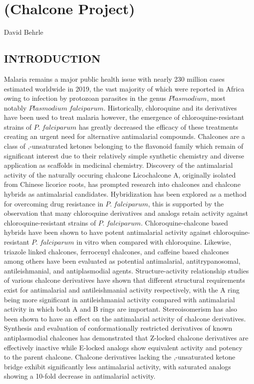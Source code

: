 \documentclass[12pt]{article}
\begin{document}
\linespread{1.25}
\raggedright
\setlength{\parskip}{6pt}

\section*{(Chalcone Project)}

David Behrle

\subsection*{INTRODUCTION}
Malaria remains a major public health issue with nearly 230 million cases estimated worldwide in 2019, the vast majority of which were reported in Africa owing to infection by protozoan parasites in the genus $Plasmodium$, most notably $Plasmodium\; falciparum$.\cite{Fikadu2023} Historically, chloroquine and its derivatives have been used to treat malaria however, the emergence of chloroquine-resistant strains of $P.\; falciparum$ has greatly decreased the efficacy of these treatments creating an urgent need for alternative antimalarial compounds.\cite{Fikadu2023,Yadav2012} Chalcones are a class of \textalpha,\textbeta-unsaturated ketones belonging to the flavonoid family which remain of significant interest due to their relatively simple synthetic chemistry and diverse application as scaffolds in medicinal chemistry.\cite{Qin2020} Discovery of the antimalarial activity of the naturally occuring chalcone Licochalcone A, originally isolated from Chinese licorice roots, has prompted research into chalcones and chalcone hybrids as antimalarial candidates.\cite{Cheng2020,Chen1994} Hybridization has been explored as a method for overcoming drug resistance in $P.\; falciparum$, this is supported by the observation that many chloroquine derivatives and analogs retain activity against chloroquine-resistant strains of $P.\; falciparum$.\cite{Cheng2020,Sashidhara2012} Chloroquine-chalcone based hybrids have been shown to have potent antimalarial activity against chloroquine-resistant $P.\; falciparum$ in vitro when compared with chloroquine.\cite{Sashidhara2012} Likewise, triazole linked chalcones, ferrocenyl chalcones, and caffeine based chalcones among others have been evaluated as potential antimalarial, antitrypanosomal, antileishmanial, and antiplasmodial agents.\cite{Qin2020,Singh2017,Insuasty2015} Structure-activity relationship studies of various chalcone derivatives have shown that different structural requirements exist for antimalarial and antileishmanial activity respectively, with the A ring being more significant in antileishmanial activity compared with antimalarial activity in which both A and B rings are important.\cite{Liu2003} Stereoisomerism has also been shown to have an effect on the antimalarial activity of chalcone derivatives. Synthesis and evaluation of conformationally restricted derivatives of known antiplasmodial chalcones has demonstrated that Z-locked chalcone derivatives are effectively inactive while E-locked analogs show equivalent activity and potency to the parent chalcone.\cite{Larsen2005} Chalcone derivatives lacking the \textalpha,\textbeta-unsaturated ketone bridge exhibit significantly less antimalarial activity, with saturated analogs showing a 10-fold decrease in antimalarial activity.\cite{Li1995}
\end{document}
